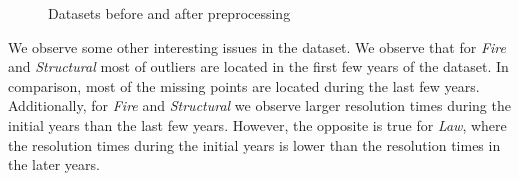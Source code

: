 {\begin{figure}[!ht]
    \centering
	\caption{Datasets before and after preprocessing}
  \label{fig:before_after} 
  \vspace{-1mm}
\end{figure}


We observe some other interesting issues in the dataset. We observe that for {\it Fire} and {\it Structural} most of outliers are located in the first  few years of the dataset. In comparison, most of the missing points are located during the last few years.  Additionally, for {\it Fire} and {\it Structural} we observe larger resolution times during the initial years than the last few years. However, the opposite is true for \textit{Law},  where the resolution times during the initial years is lower than the resolution times in the later years. 


}

